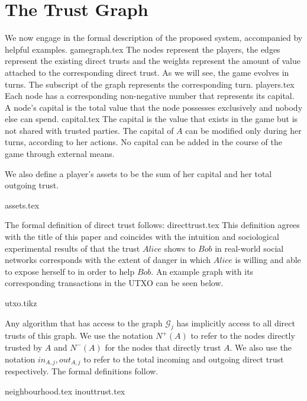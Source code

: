 \section{The Trust Graph}
  We now engage in the formal description of the proposed system, accompanied by helpful examples.
  {gamegraph.tex}
  The nodes represent the players, the edges represent the existing direct trusts and the weights represent the amount of
  value attached to the corresponding direct trust. As we will see, the game evolves in turns. The subscript of the graph
  represents the corresponding turn.
  {players.tex}
  Each node has a corresponding non-negative number that represents its capital. A node's capital is the total value that
  the node possesses exclusively and nobody else can spend.
  {capital.tex}
  The capital is the value that exists in the game but is not shared with trusted parties. The capital of $A$ can be
  modified only during her turns, according to her actions. No capital can be added in the course of the game through
  external means.

  We also define a player's assets to be the sum of her capital and her total outgoing trust.

  {assets.tex}

  The formal definition of direct trust follows:
  {directtrust.tex}
  This definition agrees with the title of this paper and coincides with the intuition and sociological experimental results
  of \cite{kmrs} that the trust $Alice$ shows to $Bob$ in real-world social networks corresponds with the extent
  of danger in which $Alice$ is willing and able to expose herself to in order to help $Bob$. An example graph with its
  corresponding transactions in the UTXO can be seen below.

  {utxo.tikz}

  Any algorithm that has access to the graph $\mathcal{G}_j$ has implicitly access to all direct trusts of this graph.
  We use the notation $N^{+}(A)$ to refer to the nodes directly trusted by $A$ and $N^{-}(A)$ for the nodes that directly
  trust $A$. We also use the notation $in_{A, j}, out_{A, j}$ to refer to the total incoming and outgoing direct trust
  respectively. The formal definitions follow. %

  {neighbourhood.tex}
  {inouttrust.tex}

